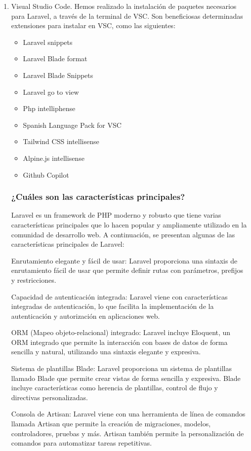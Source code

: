 \documentclass{article}
\begin{document}
\begin{enumerate}
\item  Visual Studio Code.
Hemos realizado la instalación de paquetes necesarios para Laravel, a través de la terminal de VSC.
Son beneficiosas determinadas extensiones para instalar en VSC, como las siguientes:
\begin{itemize}
    \item Laravel snippets
    \item Laravel Blade format
    \item Laravel Blade Snippets
    \item Laravel go to view
    \item Php intelliphense
    \item Spanish Language Pack for VSC
    \item Tailwind CSS intellisense
    \item Alpine.js intellisense
    \item Github Copilot
\end{itemize}

\subsubsection{¿Cuáles son las características principales?}
Laravel es un framework de PHP moderno y robusto que tiene varias características principales que lo hacen popular y ampliamente utilizado en la comunidad de desarrollo web. A continuación, se presentan algunas de las características principales de Laravel:

Enrutamiento elegante y fácil de usar: Laravel proporciona una sintaxis de enrutamiento fácil de usar que permite definir rutas con parámetros, prefijos y restricciones.

Capacidad de autenticación integrada: Laravel viene con características integradas de autenticación, lo que facilita la implementación de la autenticación y autorización en aplicaciones web.

ORM (Mapeo objeto-relacional) integrado: Laravel incluye Eloquent, un ORM integrado que permite la interacción con bases de datos de forma sencilla y natural, utilizando una sintaxis elegante y expresiva.

Sistema de plantillas Blade: Laravel proporciona un sistema de plantillas llamado Blade que permite crear vistas de forma sencilla y expresiva. Blade incluye características como herencia de plantillas, control de flujo y directivas personalizadas.

Consola de Artisan: Laravel viene con una herramienta de línea de comandos llamada Artisan que permite la creación de migraciones, modelos, controladores, pruebas y más. Artisan también permite la personalización de comandos para automatizar tareas repetitivas.


\end{enumerate}
\end{document}
